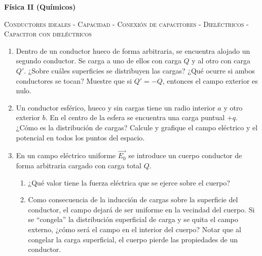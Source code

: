 \documentclass[11pt,spanish,a4paper]{article}
\begin{document}
\noindent
\textbf{Física II (Químicos)}\hfill {}
\begin{center}
  \textsc{\large Conductores ideales - Capacidad - Conexión de capacitores - Dieléctricos - Capacitor con dieléctricos}  
\par\end{center}{\large \par}


\begin{enumerate}

\section*{Conductores ideales - Capacidad}

  \item Dentro de un conductor hueco de forma arbitraria, se encuentra alojado un segundo conductor.
Se carga a uno de ellos con carga \(Q\) y al otro con carga \(Q'\).
¿Sobre cuáles superficies se distribuyen las cargas?
¿Qué ocurre si ambos conductores se tocan?
Muestre que si \(Q'= -Q\), entonces el campo exterior es nulo.
 
 
  \item Un conductor esférico, hueco y sin cargas tiene un radio interior \(a\) y otro exterior \(b\).
En el centro de la esfera se encuentra una carga puntual \(+q\).
¿Cómo es la distribución de cargas?
Calcule y grafique el campo eléctrico y el potencial en todos los puntos del espacio.


  \item En un campo eléctrico uniforme \(\vec{E_0}\) se introduce un cuerpo conductor de forma arbitraria cargado con carga total \(Q\).
\begin{enumerate}
  \item ¿Qué valor tiene la fuerza eléctrica que se ejerce sobre el cuerpo?
  \item Como consecuencia de la inducción de cargas sobre la superficie del conductor, el campo dejará de ser uniforme en la vecindad del cuerpo.
Si se ``congela'' la distribución superficial de carga y se quita el campo externo, ¿cómo será el campo en el interior del cuerpo?
Notar que al congelar la carga superficial, el cuerpo pierde las propiedades de un conductor.
\end{enumerate}



\end{enumerate}
\end{document}
